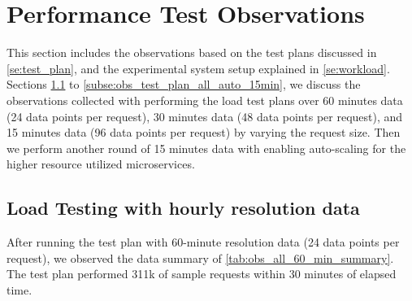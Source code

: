 \section{Performance Test Observations}
\label{se:observations}

This section includes the observations based on the test plans discussed in \cref{se:test_plan}, and the experimental system setup explained in \cref{se:workload}. Sections \ref{subse:obs_test_plan_all_60min} to \ref{subse:obs_test_plan_all_auto_15min}, we discuss the observations collected with performing the load test plans over 60 minutes data (24 data points per request), 30 minutes data (48 data points per request), and 15 minutes data (96 data points per request) by varying the request size. Then we perform another round of 15 minutes data with enabling auto-scaling for the higher resource utilized microservices.

\subsection{Load Testing with hourly resolution data}
\label{subse:obs_test_plan_all_60min}

After running the test plan with 60-minute resolution data (24 data points per request), we observed the data summary of \cref{tab:obs_all_60_min_summary}. The test plan performed 311k of sample requests within 30 minutes of elapsed time.

